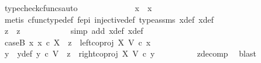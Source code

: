 \begin{isabellebody}
\ {\isacharparenleft}{\kern0pt}typecheck{\isacharunderscore}{\kern0pt}cfuncs{\isacharcomma}{\kern0pt}auto{\isacharparenright}{\kern0pt}\isanewline
\ \ \ \ \ \ \ \ \ \ \isamarkupfalse%
\ \isamarkupfalse%
\ {\isachardoublequoteopen}x{}\ {\isacharequal}{\kern0pt}\ x{}{\isachardoublequoteclose}\isanewline
\ \ \ \ \ \ \ \ \ \ \ \ \isamarkupfalse%
\ {\isacharparenleft}{\kern0pt}metis\ cfunc{\isacharunderscore}{\kern0pt}type{\isacharunderscore}{\kern0pt}def\ f{\isacharunderscore}{\kern0pt}epi\ injective{\isacharunderscore}{\kern0pt}def\ type{\isacharunderscore}{\kern0pt}assms{\isacharparenleft}{\kern0pt}{}{\isacharparenright}{\kern0pt}\ x{}{\isacharunderscore}{\kern0pt}def\ x{}{\isacharunderscore}{\kern0pt}def{\isacharparenright}{\kern0pt}\isanewline
\ \ \ \ \ \ \ \ \isamarkupfalse%
\isanewline
\ \ \ \ \ \ \ \ \isamarkupfalse%
\ \isamarkupfalse%
\ {\isachardoublequoteopen}z{}\ {\isacharequal}{\kern0pt}\ z{}{\isachardoublequoteclose}\isanewline
\ \ \ \ \ \ \ \ \ \ \isamarkupfalse%
\ {\isacharparenleft}{\kern0pt}simp\ add{\isacharcolon}{\kern0pt}\ x{}{\isacharunderscore}{\kern0pt}def\ x{}{\isacharunderscore}{\kern0pt}def{\isacharparenright}{\kern0pt}\isanewline
\ \ \ \ \ \ \isamarkupfalse%
\isanewline
\ \ \ \ \isamarkupfalse%
\ \isanewline
\ \ \ \ \ \ \isamarkupfalse%
\ caseB{\isacharcolon}{\kern0pt}\ {\isachardoublequoteopen}{\isasymnexists}x{}{\isachardot}{\kern0pt}\ x{}\ {\isasymin}\isactrlsub c\ X\ {\isasymand}\ z{}\ {\isacharequal}{\kern0pt}\ left{\isacharunderscore}{\kern0pt}coproj\ X\ V\ {\isasymcirc}\isactrlsub c\ x{}{\isachardoublequoteclose}\isanewline
\ \ \ \ \ \ \isamarkupfalse%
\ \isamarkupfalse%
\ y{}\ \ y{}{\isacharunderscore}{\kern0pt}def{\isacharcolon}{\kern0pt}\ {\isachardoublequoteopen}{\isacharparenleft}{\kern0pt}y{}\ {\isasymin}\isactrlsub c\ V\ {\isasymand}\ z{}\ {\isacharequal}{\kern0pt}\ right{\isacharunderscore}{\kern0pt}coproj\ X\ V\ {\isasymcirc}\isactrlsub c\ y{}{\isacharparenright}{\kern0pt}{\isachardoublequoteclose}\isanewline
\ \ \ \ \ \ \ \ \isamarkupfalse%
\ z{}{\isacharunderscore}{\kern0pt}decomp\ \isamarkupfalse%
\ blast\isanewline
\ \ \ \ \ \ \isamarkupfalse%

\end{isabellebody}

